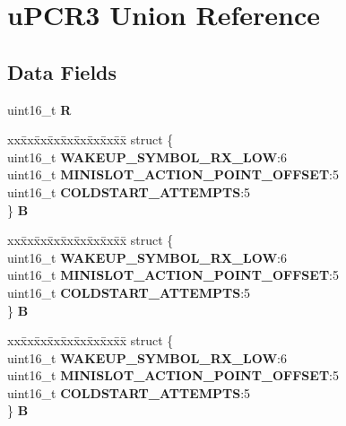 \hypertarget{unionuPCR3}{}\section{u\+P\+C\+R3 Union Reference}
\label{unionuPCR3}
\subsection*{Data Fields}
\begin{DoxyCompactItemize}
\item 
\mbox{\label{unionuPCR3_af27dffa5155bd3097fbf3db852dbc3a7}} 
uint16\+\_\+t {\bfseries R}
\item 
\mbox{\label{unionuPCR3_a30a909e8b981638e9af37806c7f9fd79}} 
\begin{tabbing}
xx\=xx\=xx\=xx\=xx\=xx\=xx\=xx\=xx\=\kill
struct \{\\
\>uint16\_t {\bfseries WAKEUP\_SYMBOL\_RX\_LOW}:6\\
\>uint16\_t {\bfseries MINISLOT\_ACTION\_POINT\_OFFSET}:5\\
\>uint16\_t {\bfseries COLDSTART\_ATTEMPTS}:5\\
\} {\bfseries B}\\

\end{tabbing}\item 
\mbox{\label{unionuPCR3_a41140b1d71d30a47723e58d744ed809b}} 
\begin{tabbing}
xx\=xx\=xx\=xx\=xx\=xx\=xx\=xx\=xx\=\kill
struct \{\\
\>uint16\_t {\bfseries WAKEUP\_SYMBOL\_RX\_LOW}:6\\
\>uint16\_t {\bfseries MINISLOT\_ACTION\_POINT\_OFFSET}:5\\
\>uint16\_t {\bfseries COLDSTART\_ATTEMPTS}:5\\
\} {\bfseries B}\\

\end{tabbing}\item 
\mbox{\label{unionuPCR3_ae3185f3e308cf2648fbccb0437d99a2f}} 
\begin{tabbing}
xx\=xx\=xx\=xx\=xx\=xx\=xx\=xx\=xx\=\kill
struct \{\\
\>uint16\_t {\bfseries WAKEUP\_SYMBOL\_RX\_LOW}:6\\
\>uint16\_t {\bfseries MINISLOT\_ACTION\_POINT\_OFFSET}:5\\
\>uint16\_t {\bfseries COLDSTART\_ATTEMPTS}:5\\
\} {\bfseries B}\\


\end{tabbing}
\end{DoxyCompactItemize}
